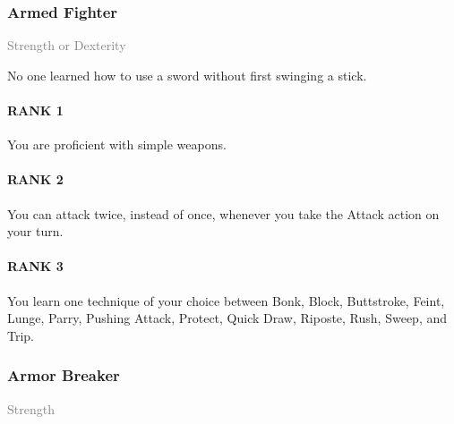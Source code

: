%
\subsubsection{Armed Fighter} \label{feat::armedfighter}
\small{\textcolor{gray}{Strength or Dexterity}}

\normalsize
No one learned how to use a sword without first swinging a stick.
\paragraph{RANK 1} You are proficient with simple weapons.
\paragraph{RANK 2} You can attack twice, instead of once, whenever you take the Attack action on your turn.
\paragraph{RANK 3} You learn one technique of your choice between Bonk, Block, Buttstroke, Feint, Lunge, Parry, Pushing Attack, Protect, Quick Draw, Riposte, Rush, Sweep, and Trip.

\subsubsection{Armor Breaker} \label{feat::armorbreaker}
\small{\textcolor{gray}{Strength}}

